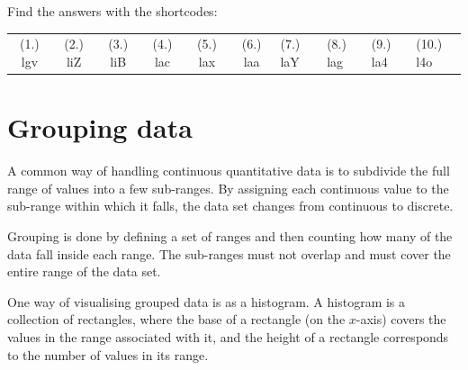 \begin{exercises}{}
{\begin{enumerate}[noitemsep, label=\textbf{\arabic*}.]
\end{enumerate}
\practiceinfo
\par {}Find the answers with the shortcodes:
\par \begin{tabular}[h]{cccccc}
(1.) lgv  &  (2.) liZ  &  (3.) liB  &  (4.) lac  &  (5.) lax  &  (6.) laa  &  (7.) laY  &  (8.) lag  &  (9.) la4  &  (10.) l4o  & \end{tabular}
}
\end{exercises}

\section{Grouping data}
\label{sec:statistics_grouping_data}
A common way of handling continuous quantitative data is to subdivide
the full range of values into a few sub-ranges.
By assigning each continuous value to the sub-range within which it
falls, the data set changes from continuous to discrete.\par
Grouping is done by defining a set of ranges and then counting how
many of the data fall inside each range. The sub-ranges must
 not overlap and must cover the entire
range of the data set.\par

One way of visualising grouped data is as a histogram. A histogram is
a collection of rectangles, where the base of a rectangle (on the
$x$-axis) covers the values in the range associated with it, and the
height of a rectangle corresponds to the number of values in its
range.


